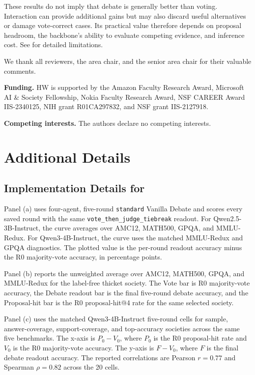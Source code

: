 These results do not imply that debate is generally better than voting. Interaction can provide additional gains but may also discard useful alternatives or damage vote-correct cases. Its practical value therefore depends on proposal headroom, the backbone's ability to evaluate competing evidence, and inference cost. See
 for detailed limitations.

\begin{ack}
We thank all reviewers, the area chair, and the senior area chair for their
valuable comments.

\textbf{Funding.}
HW is supported by the Amazon Faculty Research Award, Microsoft AI \& Society
Fellowship, Nokia Faculty Research Award, NSF CAREER Award IIS-2340125,
NIH grant R01CA297832, and NSF grant IIS-2127918.

\textbf{Competing interests.}
The authors declare no competing interests.
\end{ack}

\appendix

\section{Additional Details}

\subsection{Implementation Details for }
\label{app:motivating_observations}

Panel (a) uses four-agent, five-round \texttt{standard} Vanilla Debate and scores
every saved round with the same \texttt{vote\_then\_judge\_tiebreak} readout.
For Qwen2.5-3B-Instruct, the curve averages over AMC12, MATH500, GPQA, and
MMLU-Redux. For Qwen3-4B-Instruct, the curve uses the
matched MMLU-Redux and GPQA diagnostics. The plotted value is the per-round
readout accuracy minus the R0 majority-vote accuracy, in percentage points.

Panel (b) reports the unweighted average over AMC12, MATH500, GPQA, and
MMLU-Redux for the label-free thicket society. The Vote bar is R0
majority-vote accuracy, the Debate readout bar is the final five-round debate
accuracy, and the Proposal-hit bar is the R0 proposal-hit@4 rate for the same
selected society.

Panel (c) uses the matched Qwen3-4B-Instruct five-round cells for sample,
answer-coverage, support-coverage, and top-accuracy societies across the same
five benchmarks. The x-axis is $P_0 - V_0$, where $P_0$ is the R0 proposal-hit
rate and $V_0$ is the R0 majority-vote accuracy. The y-axis is $F - V_0$, where
$F$ is the final debate readout accuracy. The reported correlations are Pearson
$r=0.77$ and Spearman $\rho=0.82$ across the 20 cells.

